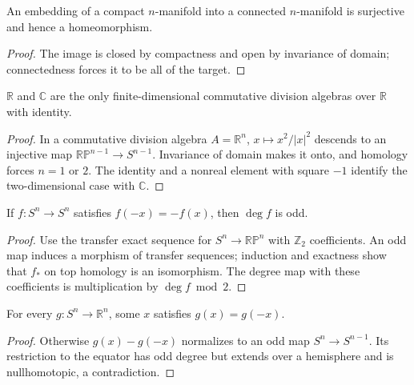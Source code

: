 \begin{corollary}
\label{cor:embedding-compact-manifold-connected}
An embedding of a compact $n$-manifold into a connected $n$-manifold is surjective and hence a homeomorphism.
\end{corollary}
\begin{proof}
\sketch The image is closed by compactness and open by invariance of domain; connectedness forces it to be all of the target.
\end{proof}

\begin{theorem}
\label{thm:real-complex-division-algebras}
$\mathbb{R}$ and $\mathbb{C}$ are the only finite-dimensional commutative division algebras over $\mathbb{R}$ with identity.
\end{theorem}
\begin{proof}
\sketch In a commutative division algebra $A=\mathbb{R}^n$, $x\mapsto x^2/|x|^2$ descends to an injective map $\mathbb{RP}^{n-1}\to S^{n-1}$.  Invariance of domain makes it onto, and homology forces $n=1$ or $2$.  The identity and a nonreal element with square $-1$ identify the two-dimensional case with $\mathbb{C}$.
\end{proof}

\begin{proposition}
\label{prop:odd-map-odd-degree}
If $f:S^n\to S^n$ satisfies $f(-x)=-f(x)$, then $\deg f$ is odd.
\end{proposition}
\begin{proof}
\sketch Use the transfer exact sequence for $S^n\to\mathbb{RP}^n$ with $\mathbb{Z}_2$ coefficients.  An odd map induces a morphism of transfer sequences; induction and exactness show that $f_*$ on top homology is an isomorphism.  The degree map with these coefficients is multiplication by $\deg f\bmod2$.
\end{proof}

\begin{corollary}
\label{cor:borsuk-ulam}
For every $g:S^n\to\mathbb{R}^n$, some $x$ satisfies $g(x)=g(-x)$.
\end{corollary}
\begin{proof}
\sketch Otherwise $g(x)-g(-x)$ normalizes to an odd map $S^n\to S^{n-1}$.  Its restriction to the equator has odd degree but extends over a hemisphere and is nullhomotopic, a contradiction.
\end{proof}

